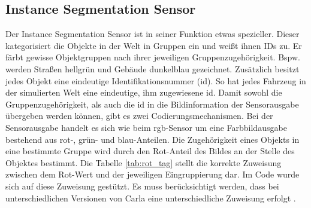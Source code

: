 \subsection{Instance Segmentation Sensor}
Der Instance Segmentation Sensor ist in seiner Funktion etwas spezieller. Dieser kategorisiert die Objekte in der Welt in Gruppen ein und weißt ihnen IDs zu. Er färbt gewisse Objektgruppen nach ihrer jeweiligen Gruppenzugehörigkeit. Bspw. werden Straßen hellgrün und Gebäude dunkelblau gezeichnet. Zusätzlich besitzt jedes Objekt eine eindeutige Identifikationsnummer (\acrshort{id}). So hat jedes Fahrzeug in der simulierten Welt eine eindeutige, ihm zugewiesene \acrshort{id}. Damit sowohl die Gruppenzugehörigkeit, als auch die \acrshort{id} in die Bildinformation der Sensorausgabe übergeben werden können, gibt es zwei Codierungsmechanismen. Bei der Sensorausgabe handelt es sich wie beim \acrshort{rgb}-Sensor um eine Farbbildausgabe bestehend aus rot-, grün- und blau-Anteilen. Die Zugehörigkeit eines Objekts in eine bestimmte Gruppe wird durch den Rot-Anteil des Bildes an der Stelle des Objektes bestimmt. Die Tabelle \ref{tab:rot_tag} stellt die korrekte Zuweisung zwischen dem Rot-Wert und der jeweiligen Eingruppierung dar. Im Code wurde sich auf diese Zuweisung gestützt. Es muss berücksichtigt werden, dass bei unterschiedlichen Versionen von Carla eine unterschiedliche Zuweisung erfolgt \cite{lit_website_carla_documentation}. 



